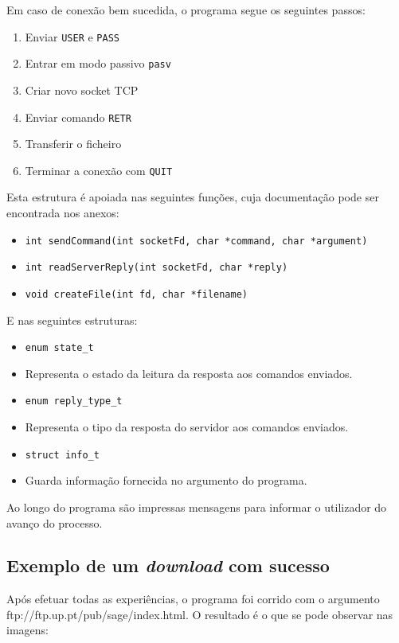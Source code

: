 \documentclass{article}
\begin{document}
Em caso de conexão bem sucedida, o programa segue os seguintes passos:
\begin{enumerate}
\item Enviar \texttt{USER} e \texttt{PASS}
\item Entrar em modo passivo \texttt{pasv}
\item Criar novo socket TCP
\item Enviar comando \texttt{RETR}
\item Transferir o ficheiro
\item Terminar a conexão com \texttt{QUIT}
\end{enumerate}

Esta estrutura é apoiada nas seguintes funções, cuja documentação pode ser encontrada nos anexos:
\begin{itemize}
\item \texttt{int sendCommand(int socketFd, char *command, char *argument)}
\item \texttt{int readServerReply(int socketFd, char *reply)}
\item \texttt{void createFile(int fd, char *filename)}
\end{itemize}

E nas seguintes estruturas:

\begin{itemize}
\item \texttt{enum state_t}
\item[] Representa o estado da leitura da resposta aos comandos enviados.
\item \texttt{enum reply_type_t}
\item[] Representa o tipo da resposta do servidor aos comandos enviados. 
\item \texttt{struct info_t}
\item[] Guarda informação fornecida no argumento do programa. 
\end{itemize}


Ao longo do programa são impressas mensagens para informar o utilizador do avanço do processo.
\subsection{Exemplo de um \textit{download} com sucesso}
Após efetuar todas as experiências, o programa foi corrido com o argumento
ftp://ftp.up.pt/pub/sage/index.html.
O resultado é o que se pode observar nas imagens:
\end{document}
